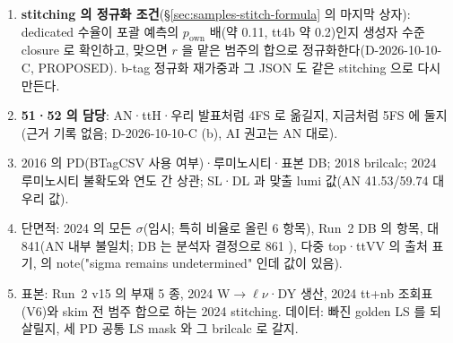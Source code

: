 \begin{openq}[2 장의 미결 사항(분석자 결정 또는 확인)]
\begin{enumerate}
  \item \textbf{stitching 의 정규화 조건}(\S\ref{sec:samples-stitch-formula} 의 마지막 상자): dedicated 수율이 포괄 예측의 $p_{\mathrm{own}}$ 배(\ttbb 약 0.11, tt4b 약 0.2)인지
        생성자 수준 closure 로 확인하고, 맞으면 $r$ 을 맡은 범주의 합으로 정규화한다(D-2026-10-10-C, PROPOSED). b-tag 정규화 재가중과 그 JSON 도 같은 stitching 으로 다시 만든다.
  \item \textbf{51·52 의 담당}: AN·ttH·우리 발표처럼 4FS 로 옮길지, 지금처럼 5FS 에 둘지(근거 기록 없음; D-2026-10-10-C (b), AI 권고는 AN 대로).
  \item 2016 의 PD(BTagCSV 사용 여부)·루미노시티·표본 DB; 2018 brilcalc; 2024 루미노시티 불확도와 연도 간 상관; SL·DL 과 맞출 lumi 값(AN 41.53/59.74 대 우리 값).
  \item 단면적: 2024 의 모든 $\sigma$(임시; 특히 비율로 올린 6 항목), Run~2 DB 의  항목,  대 841\fb(AN 내부 불일치; DB 는 분석자 결정으로 861
        ), 다중 top·ttVV 의 출처 표기,  의 note("sigma remains undetermined" 인데 값이 있음).
  \item 표본: Run~2 v15 의 부재 5 종, 2024 W$\to\ell\nu$·DY 생산, 2024 tt+nb 조회표(V6)와 skim 전 범주 합으로 하는 2024 stitching. 데이터: 빠진 golden LS 를 되살릴지,
        세 PD 공통 LS mask 와 그 brilcalc 로 갈지.
\end{enumerate}
\end{openq}
